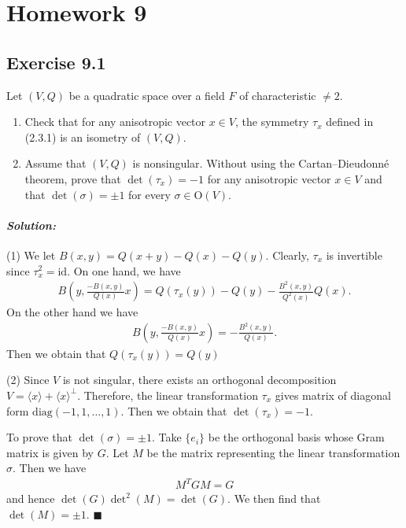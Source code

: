 \documentclass[12pt, a4paper]{article}
\newenvironment{solution}
  {\paragraph{\textit{Solution:}}\par\medskip}
  {\hfill$\blacksquare$\vspace{0.1cm}}
\begin{document}
\section*{Homework 9}

\subsection*{Exercise 9.1}
 Let $(V, Q)$ be a quadratic space over a field $F$ of characteristic $\neq 2$.
\begin{enumerate}
    \item Check that for any anisotropic vector $x \in V$, the symmetry $\tau_x$ defined in (2.3.1) is an isometry of $(V, Q)$.
    \item Assume that $(V, Q)$ is nonsingular. Without using the Cartan--Dieudonné theorem, prove that $\det(\tau_x) = -1$ for any anisotropic vector $x \in V$ and that $\det(\sigma) = \pm 1$ for every $\sigma \in \mathrm{O}(V)$.
\end{enumerate}
\begin{solution}
    (1)
    We let $B(x,y)=Q(x+y)-Q(x)-Q(y)$.
    Clearly, $\tau_x$ is invertible since $\tau_x^2 = \text{id}$. 
    On one hand, we have
    \begin{align*}
        B\left(y,\frac{-B(x,y)}{Q(x)}x\right) = Q(\tau_x(y)) - Q(y) - \frac{B^2(x,y)}{Q^2(x)}Q(x).
    \end{align*} 
    On the other hand we have 
    \begin{align*}
        B\left(y,\frac{-B(x,y)}{Q(x)}x\right) = -\frac{B^2(x,y)}{Q(x)}.
    \end{align*}
    Then we obtain that $Q(\tau_x(y))=Q(y)$

    (2) Since $V$ is not singular, there exists an orthogonal decomposition $V = \langle x\rangle+ \langle x\rangle^\perp$. Therefore, the linear transformation $\tau_x$ gives
    matrix of diagonal form $\text{diag}(-1,1,\dots,1)$. Then we obtain that $\det(\tau_x)=-1$.

    To prove that $\det(\sigma)=\pm 1$. Take $\{e_i\}$ be the orthogonal basis whose Gram matrix is given by $G$. Let $M$ be the matrix representing the linear transformation $\sigma$.
    Then we have 
    \begin{align*}
        M^TGM = G
    \end{align*}
    and hence $\det(G)\det^2(M)=\det(G)$. We then find that $\det(M)=\pm 1$.
\end{solution}
\end{document}
